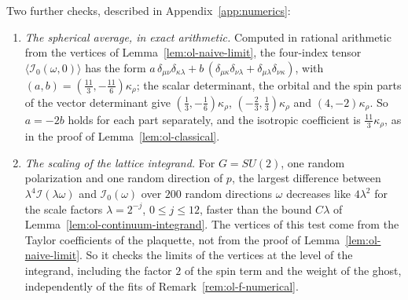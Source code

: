 \begin{remark}\label{rem:ol-integrand-numerical}
Two further checks, described in Appendix~\ref{app:numerics}:
\begin{enumerate}[label=(\roman*)]
\item \emph{The spherical average, in exact arithmetic.} Computed in rational arithmetic from the vertices of Lemma~\ref{lem:ol-naive-limit}, the four-index tensor $\langle\mathcal I_0(\omega,0)\rangle$ has the form $a\,\delta_{\mu\nu}\delta_{\kappa\lambda}+b\,(\delta_{\mu\kappa}\delta_{\nu\lambda}+\delta_{\mu\lambda}\delta_{\nu\kappa})$, with $(a,b)=(\frac{11}3,-\frac{11}6)\kappa_\rho$; the scalar determinant, the orbital and the spin parts of the vector determinant give $(\frac13,-\frac16)\kappa_\rho$, $(-\frac23,\frac13)\kappa_\rho$ and $(4,-2)\kappa_\rho$. So $a=-2b$ holds for each part separately, and the isotropic coefficient is $\frac{11}3\kappa_\rho$, as in the proof of Lemma~\ref{lem:ol-classical}.
\item \emph{The scaling of the lattice integrand.} For $G=SU(2)$, one random polarization and one random direction of $p$, the largest difference between $\lambda^4\mathcal I(\lambda\omega)$ and $\mathcal I_0(\omega)$ over $200$ random directions $\omega$ decreases like $4\lambda^2$ for the scale factors $\lambda=2^{-j}$, $0\le j\le12$, faster than the bound $C\lambda$ of Lemma~\ref{lem:ol-continuum-integrand}. The vertices of this test come from the Taylor coefficients of the plaquette, not from the proof of Lemma~\ref{lem:ol-naive-limit}. So it checks the limits of the vertices at the level of the integrand, including the factor $2$ of the spin term and the weight of the ghost, independently of the fits of Remark~\ref{rem:ol-f-numerical}.
\end{enumerate}
\end{remark}
